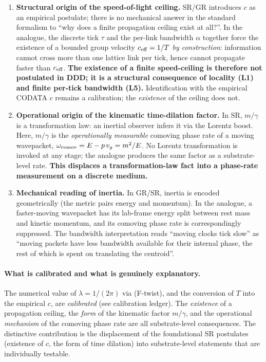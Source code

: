 \documentclass[11pt,a4paper]{article}
\begin{document}
\begin{enumerate}
\item \textbf{Structural origin of the speed-of-light ceiling.}
SR/GR introduces $c$ as an empirical postulate; there is no
mechanical answer in the standard formalism to ``why does a
finite propagation ceiling exist at all?''. In the analogue,
the discrete tick $\tau$ and the per-link bandwidth $\alpha$
together force the existence of a bounded group velocity
$c_{\rm eff} = 1/T$ \emph{by construction}: information cannot
cross more than one lattice link per tick, hence cannot
propagate faster than $c_{\rm eff}$. \textbf{The existence of a
finite speed-ceiling is therefore not postulated in DDD; it is
a structural consequence of locality (L1) and finite per-tick
bandwidth (L5).} Identification with the empirical CODATA $c$
remains a calibration; the \emph{existence} of the ceiling does
not.

\item \textbf{Operational origin of the kinematic time-dilation
factor.} In SR, $m/\gamma$ is a transformation law: an inertial
observer infers it via the Lorentz boost. Here, $m/\gamma$ is
the \emph{operationally measurable} comoving phase rate of a
moving wavepacket, $\omega_{\rm comov} = E - p\,v_g = m^2/E$.
No Lorentz transformation is invoked at any stage; the
analogue produces the same factor as a substrate-level rate.
\textbf{This displaces a transformation-law fact into a
phase-rate measurement on a discrete medium.}

\item \textbf{Mechanical reading of inertia.} In GR/SR,
inertia is encoded geometrically (the metric pairs energy and
momentum). In the analogue, a faster-moving wavepacket has its
lab-frame energy split between rest mass and kinetic
momentum, and its comoving phase rate is correspondingly
suppressed. The bandwidth interpretation reads ``moving
clocks tick slow'' as ``moving packets have less bandwidth
available for their internal phase, the rest of which is
spent on translating the centroid''.
\end{enumerate}

\paragraph{What is calibrated and what is genuinely
explanatory.} The numerical value of $\lambda = 1/(2\pi)$ via
(F-twist), and the conversion of $T$ into the empirical $c$,
are \emph{calibrated} (see calibration ledger). The
\emph{existence} of a propagation ceiling, the \emph{form} of
the kinematic factor $m/\gamma$, and the operational
\emph{mechanism} of the comoving phase rate are all
substrate-level consequences. The distinctive contribution is
the displacement of the foundational SR postulates (existence
of $c$, the form of time dilation) into substrate-level
statements that are individually testable.
\end{document}
